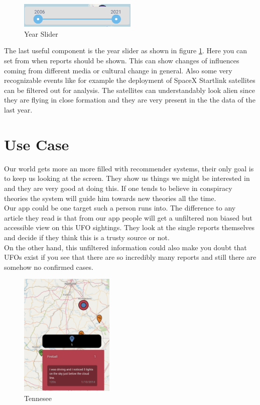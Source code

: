 \documentclass{article}
\begin{document}
\begin{figure} 
    \centering
    \includegraphics[width=0.5\textwidth]{yearSilder}
    \caption{Year Slider}
    \label{fig:yearSilder}
\end{figure}

The last useful component is the year slider as shown in figure \ref{fig:yearSilder}. Here you can set from when reports should be shown. This can show changes of influences coming from different media or cultural change in general. Also some very recognizable events like for example the deployment of SpaceX Startlink satellites can be filtered out for analysis. The satellites can understandably look alien since they are flying in close formation and they are very present in the the data of the last year.

\section*{Use Case}

Our world gets more an more filled with recommender systems, their only goal is to keep us looking at the screen. They show us things we might be interested in and they are very good at doing this. If one tends to believe in conspiracy theories the system will guide him towards new theories all the time.  \\
Our app could be one target such a person runs into. The difference to any article they read is that from our app people will get a unfiltered non biased but accessible view on this UFO sightings. They look at the single reports themselves and decide if they think this is a trusty source or not. \\
On the other hand, this unfiltered information could also make you doubt that UFOs exist if you see that there are so incredibly many reports and still there are somehow no confirmed cases. 

\newpage

\begin{figure} 
    \centering
    \includegraphics[width=0.4\textwidth]{Tennesee}
    \caption{Tennesee}
    \label{fig:Tennesee}
\end{figure}
\end{document}
